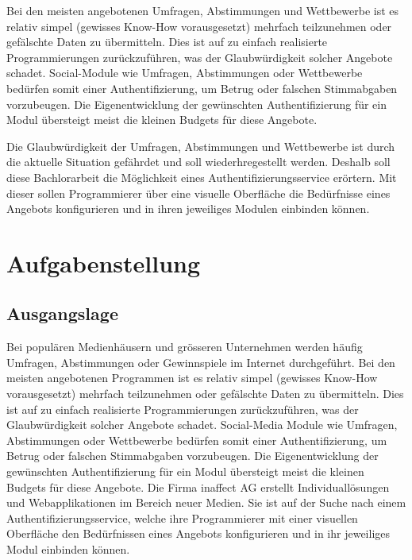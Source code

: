 Bei den meisten angebotenen Umfragen, Abstimmungen und Wettbewerbe ist
es relativ simpel (gewisses Know-How vorausgesetzt) mehrfach
teilzunehmen oder gefälschte Daten zu übermitteln. Dies ist auf zu
einfach realisierte Programmierungen zurückzuführen, was der
Glaubwürdigkeit solcher Angebote schadet. Social-Module wie Umfragen,
Abstimmungen oder Wettbewerbe bedürfen somit einer Authentifizierung, um
Betrug oder falschen Stimmabgaben vorzubeugen. Die Eigenentwicklung der
gewünschten Authentifizierung für ein Modul übersteigt meist die kleinen
Budgets für diese Angebote.

Die Glaubwürdigkeit der Umfragen, Abstimmungen und Wettbewerbe ist durch
die aktuelle Situation gefährdet und soll wiederhregestellt werden.
Deshalb soll diese Bachlorarbeit die Möglichkeit eines
Authentifizierungsservice erörtern. Mit dieser sollen Programmierer über
eine visuelle Oberfläche die Bedürfnisse eines Angebots konfigurieren
und in ihren jeweiliges Modulen einbinden können.

\newpage

\section{Aufgabenstellung}\label{aufgabenstellung}

\subsection{Ausgangslage}\label{ausgangslage}

Bei populären Medienhäusern und grösseren Unternehmen werden häufig
Umfragen, Abstimmungen oder Gewinnspiele im Internet durchgeführt. Bei
den meisten angebotenen Programmen ist es relativ simpel (gewisses
Know-How vorausgesetzt) mehrfach teilzunehmen oder gefälschte Daten zu
übermitteln. Dies ist auf zu einfach realisierte Programmierungen
zurückzuführen, was der Glaubwürdigkeit solcher Angebote schadet.
Social-Media Module wie Umfragen, Abstimmungen oder Wettbewerbe bedürfen
somit einer Authentifizierung, um Betrug oder falschen Stimmabgaben
vorzubeugen. Die Eigenentwicklung der gewünschten Authentifizierung für
ein Modul übersteigt meist die kleinen Budgets für diese Angebote. Die
Firma inaffect AG erstellt Individuallösungen und Webapplikationen im
Bereich neuer Medien. Sie ist auf der Suche nach einem
Authentifizierungsservice, welche ihre Programmierer mit einer visuellen
Oberfläche den Bedürfnissen eines Angebots konfigurieren und in ihr
jeweiliges Modul einbinden können.

